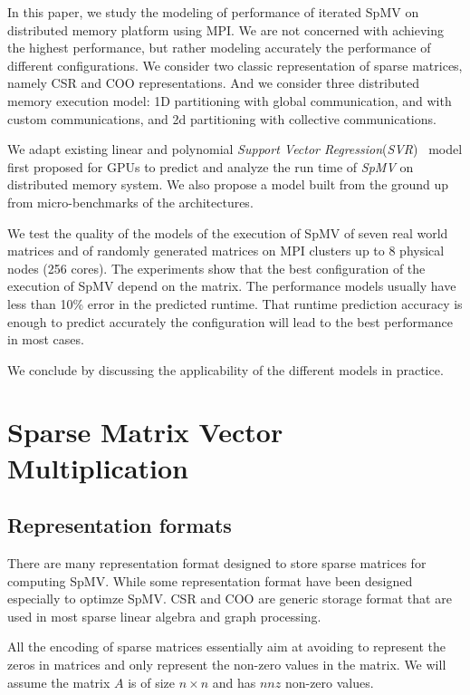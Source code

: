 \documentclass[sigconf,review,anonymous]{acmart}
\begin{document}
In this paper, we study the modeling of performance of iterated SpMV
on distributed memory platform using MPI. We are not concerned with
achieving the highest performance, but rather modeling accurately the
performance of different configurations. We consider two classic
representation of sparse matrices, namely CSR and COO
representations. And we consider three distributed memory execution
model: 1D partitioning with global communication, and with custom
communications, and 2d partitioning with collective communications.

We adapt existing linear and polynomial \textit{Support Vector
  Regression}(\textit{SVR})~\cite{awad2015support} model first
proposed for GPUs to predict and analyze the run time of \textit{SpMV}
on distributed memory system. We also propose a model built from the
ground up from micro-benchmarks of the architectures.

We test the quality of the models of the execution of SpMV of seven
real world matrices and of randomly generated matrices on MPI clusters
up to 8 physical nodes (256 cores). The experiments show that the best
configuration of the execution of SpMV depend on the matrix. The
performance models usually have less than 10\% error in the predicted
runtime. That runtime prediction accuracy is enough to predict
accurately the configuration will lead to the best performance in most
cases.

We conclude by discussing the applicability of the different models in
practice.

\section{Sparse Matrix Vector Multiplication}

\subsection{Representation formats}

There are many representation format designed to store sparse matrices
for computing SpMV. While some representation format have been
designed especially to optimze SpMV. CSR and COO are generic storage
format that are used in most sparse linear algebra and graph
processing.

All the encoding of sparse matrices essentially aim at avoiding to
represent the zeros in matrices and only represent the non-zero values
in the matrix. We will assume the matrix $A$ is of size $n \times n$
and has $nnz$ non-zero values.
\end{document}
